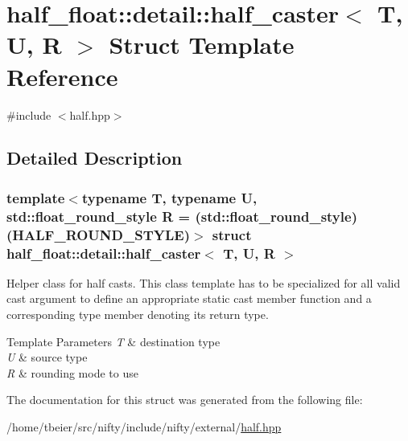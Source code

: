 \hypertarget{structhalf__float_1_1detail_1_1half__caster}{}\section{half\+\_\+float\+:\+:detail\+:\+:half\+\_\+caster$<$ T, U, R $>$ Struct Template Reference}
\label{structhalf__float_1_1detail_1_1half__caster}


{\ttfamily \#include $<$half.\+hpp$>$}



\subsection{Detailed Description}
\subsubsection*{template$<$typename T, typename U, std\+::float\+\_\+round\+\_\+style R = (std\+::float\+\_\+round\+\_\+style)(\+H\+A\+L\+F\+\_\+\+R\+O\+U\+N\+D\+\_\+\+S\+T\+Y\+L\+E)$>$\newline
struct half\+\_\+float\+::detail\+::half\+\_\+caster$<$ T, U, R $>$}

Helper class for half casts. This class template has to be specialized for all valid cast argument to define an appropriate static {\ttfamily cast} member function and a corresponding {\ttfamily type} member denoting its return type. 
\begin{DoxyTemplParams}{Template Parameters}
{\em T} & destination type \\
\hline
{\em U} & source type \\
\hline
{\em R} & rounding mode to use \\
\hline
\end{DoxyTemplParams}


The documentation for this struct was generated from the following file\+:\begin{DoxyCompactItemize}
\item 
/home/tbeier/src/nifty/include/nifty/external/\hyperlink{half_8hpp}{half.\+hpp}\end{DoxyCompactItemize}
